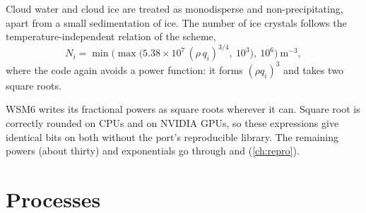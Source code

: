 Cloud water and cloud ice are treated as monodisperse and non-precipitating, apart from a small sedimentation of ice.
The number of ice crystals follows the temperature-independent relation of the scheme,
\begin{equation}
  N_i = \min\bigl(\max\bigl(5.38\times10^{7}\,(\rho\,q_i)^{3/4},\ 10^{3}\bigr),\ 10^{6}\bigr)\ \text{m}^{-3},
\end{equation}
where the code again avoids a power function: it forms $(\rho q_i)^3$ and takes two square roots.

\begin{keypoint}
WSM6 writes its fractional powers as square roots wherever it can. Square root is correctly rounded on CPUs and on
NVIDIA GPUs, so these expressions give identical bits on both without the port's reproducible library. The remaining
powers (about thirty) and exponentials go through  and  (\cref{ch:repro}).
\end{keypoint}

\section{Processes}

